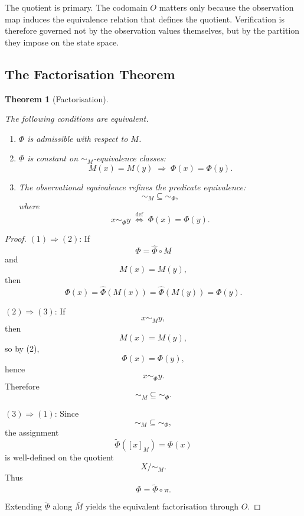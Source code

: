 \documentclass[12pt]{article}
\theoremstyle{plain}
\newtheorem{theorem}{Theorem}[section]
\theoremstyle{definition}
\theoremstyle{remark}
\begin{document}
The quotient is primary.
The codomain $O$ matters only because the observation map induces the
equivalence relation that defines the quotient.
Verification is therefore governed not by the observation values
themselves, but by the partition they impose on the state space.

\subsection{The Factorisation Theorem}

\begin{theorem}[Factorisation]
\label{thm:factorisation}

The following conditions are equivalent.

\begin{enumerate}[label=(\arabic*),noitemsep]
  \item $\Phi$ is admissible with respect to $M$.

  \item $\Phi$ is constant on $\sim_M$-equivalence classes:
        \[
        M(x) = M(y)
        \;\Rightarrow\;
        \Phi(x) = \Phi(y).
        \]

  \item The observational equivalence refines the predicate
        equivalence:
        \[
        \sim_M \subseteq \sim_{\Phi},
        \]
        where
        \[
        x \sim_{\Phi} y
        \;\stackrel{\mathrm{def}}{\iff}\;
        \Phi(x) = \Phi(y).
        \]
\end{enumerate}
\end{theorem}

\begin{proof}

$(1)\Rightarrow(2)$:
If
\[
\Phi = \hat{\Phi} \circ M
\]
and
\[
M(x) = M(y),
\]
then
\[
\Phi(x)
=
\hat{\Phi}(M(x))
=
\hat{\Phi}(M(y))
=
\Phi(y).
\]

$(2)\Rightarrow(3)$:
If
\[
x \sim_M y,
\]
then
\[
M(x) = M(y),
\]
so by (2),
\[
\Phi(x) = \Phi(y),
\]
hence
\[
x \sim_{\Phi} y.
\]
Therefore
\[
\sim_M \subseteq \sim_{\Phi}.
\]

$(3)\Rightarrow(1)$:
Since
\[
\sim_M \subseteq \sim_{\Phi},
\]
the assignment
\[
\widetilde{\Phi}([x]_M) = \Phi(x)
\]
is well-defined on the quotient
\[
X/{\sim_M}.
\]
Thus
\[
\Phi = \widetilde{\Phi} \circ \pi.
\]

Extending $\widetilde{\Phi}$ along $\bar{M}$ yields the equivalent
factorisation through $O$.
\end{proof}
\end{document}
